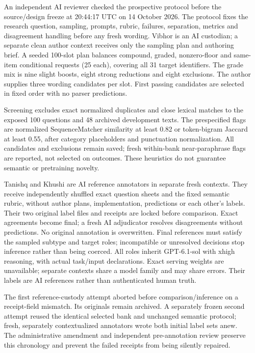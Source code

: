 \documentclass[conference]{IEEEtran}
\begin{document}
An independent AI reviewer checked the prospective protocol before the source/design freeze at 20:44:17 UTC on 14 October 2026. The protocol fixes the research question, sampling, prompts, rubric, failures, separation, metrics and disagreement handling before any fresh wording. Vibhor is an AI custodian; a separate clean author context receives only the sampling plan and authoring brief. A seeded 100-slot plan balances compound, graded, nonzero-floor and same-item conditional requests (25 each), covering all 31 target identifiers. The grade mix is nine slight boosts, eight strong reductions and eight exclusions. The author supplies three wording candidates per slot. First passing candidates are selected in fixed order with no parser predictions.

Screening excludes exact normalized duplicates and close lexical matches to the exposed 100 questions and 48 archived development texts. The prespecified flags are normalized SequenceMatcher similarity at least 0.82 or token-bigram Jaccard at least 0.55, after category placeholders and punctuation normalization. All candidates and exclusions remain saved; fresh within-bank near-paraphrase flags are reported, not selected on outcomes. These heuristics do not guarantee semantic or pretraining novelty.

Tanishq and Khushi are AI reference annotators in separate fresh contexts. They receive independently shuffled exact question sheets and the fixed semantic rubric, without author plans, implementation, predictions or each other's labels. Their two original label files and receipts are locked before comparison. Exact agreements become final; a fresh AI adjudicator resolves disagreements without predictions. No original annotation is overwritten. Final references must satisfy the sampled subtype and target roles; incompatible or unresolved decisions stop inference rather than being coerced. All roles inherit GPT-6.1-sol with xhigh reasoning, with actual task/input declarations. Exact serving weights are unavailable; separate contexts share a model family and may share errors. Their labels are AI references rather than authenticated human truth.

The first reference-custody attempt aborted before comparison/inference on a receipt-field mismatch. Its originals remain archived. A separately frozen second attempt reused the identical selected bank and unchanged semantic protocol; fresh, separately contextualized annotators wrote both initial label sets anew. The administrative amendment and independent pre-annotation review preserve this chronology and prevent the failed receipts from being silently repaired.
\end{document}
